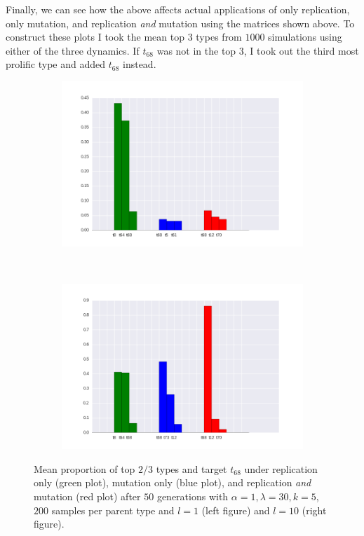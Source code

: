 \documentclass[a4paper]{article}
\begin{document}
\newpage

Finally, we can see how the above affects actual applications of only replication, only mutation, and replication \emph{and} mutation using the matrices shown above. To construct these plots I took the mean top $3$ types from $1000$ simulations using either of the three dynamics. If $t_{68}$ was not in the top $3$, I took out the third most prolific type and added $t_{68}$ instead. 

\begin{figure}[h!]
  \centering
  \begin{subfigure}[b]{0.45\textwidth}
    \includegraphics[scale=0.4]{../code-LOT-extension/plots/rmd-lam30-a1-k5-s200-l1-meFalse112.png}
  \end{subfigure}
  ~
   \begin{subfigure}[b]{0.45\textwidth}
    \includegraphics[scale=0.4]{../code-LOT-extension/plots/rmd-lam30-a1-k5-s200-l10-meFalse112.png}
  \end{subfigure}
  \caption{Mean proportion of top $2/3$ types and target $t_{68}$ under replication only (green plot), mutation only (blue plot), and replication {\em and} mutation (red plot) after $50$ generations with $\alpha = 1, \lambda = 30, k = 5$, $200$ samples per parent type and $l = 1$ (left figure) and $l = 10$ (right figure).}
  \label{fig:outcomes}
\end{figure}
\end{document}
